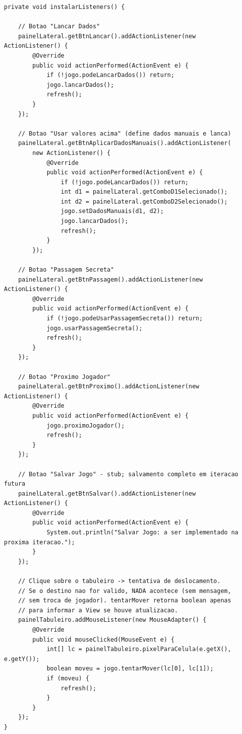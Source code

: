 \documentclass[12pt,a4paper]{report}
\begin{document}
\begin{lstlisting}
private void instalarListeners() {

    // Botao "Lancar Dados"
    painelLateral.getBtnLancar().addActionListener(new ActionListener() {
        @Override
        public void actionPerformed(ActionEvent e) {
            if (!jogo.podeLancarDados()) return;
            jogo.lancarDados();
            refresh();
        }
    });

    // Botao "Usar valores acima" (define dados manuais e lanca)
    painelLateral.getBtnAplicarDadosManuais().addActionListener(
        new ActionListener() {
            @Override
            public void actionPerformed(ActionEvent e) {
                if (!jogo.podeLancarDados()) return;
                int d1 = painelLateral.getComboD1Selecionado();
                int d2 = painelLateral.getComboD2Selecionado();
                jogo.setDadosManuais(d1, d2);
                jogo.lancarDados();
                refresh();
            }
        });

    // Botao "Passagem Secreta"
    painelLateral.getBtnPassagem().addActionListener(new ActionListener() {
        @Override
        public void actionPerformed(ActionEvent e) {
            if (!jogo.podeUsarPassagemSecreta()) return;
            jogo.usarPassagemSecreta();
            refresh();
        }
    });

    // Botao "Proximo Jogador"
    painelLateral.getBtnProximo().addActionListener(new ActionListener() {
        @Override
        public void actionPerformed(ActionEvent e) {
            jogo.proximoJogador();
            refresh();
        }
    });

    // Botao "Salvar Jogo" - stub; salvamento completo em iteracao futura
    painelLateral.getBtnSalvar().addActionListener(new ActionListener() {
        @Override
        public void actionPerformed(ActionEvent e) {
            System.out.println("Salvar Jogo: a ser implementado na proxima iteracao.");
        }
    });

    // Clique sobre o tabuleiro -> tentativa de deslocamento.
    // Se o destino nao for valido, NADA acontece (sem mensagem,
    // sem troca de jogador). tentarMover retorna boolean apenas
    // para informar a View se houve atualizacao.
    painelTabuleiro.addMouseListener(new MouseAdapter() {
        @Override
        public void mouseClicked(MouseEvent e) {
            int[] lc = painelTabuleiro.pixelParaCelula(e.getX(), e.getY());
            boolean moveu = jogo.tentarMover(lc[0], lc[1]);
            if (moveu) {
                refresh();
            }
        }
    });
}
\end{lstlisting}
\end{document}
